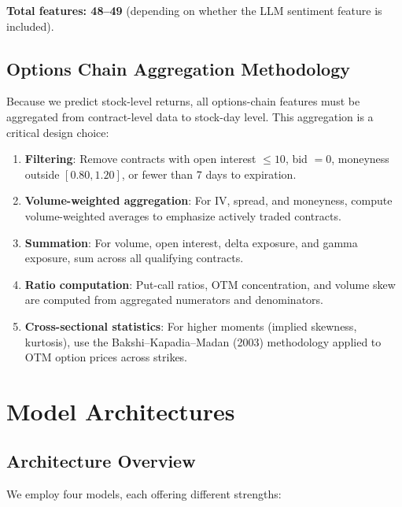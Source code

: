 \documentclass[11pt,a4paper]{article}
\begin{document}
\textbf{Total features: 48--49} (depending on whether the LLM sentiment feature is included).

\subsection{Options Chain Aggregation Methodology}
\label{sec:aggregation}

Because we predict stock-level returns, all options-chain features must be aggregated from contract-level data to stock-day level. This aggregation is a critical design choice:

\begin{enumerate}[nosep]
    \item \textbf{Filtering}: Remove contracts with open interest $\leq 10$, bid $= 0$, moneyness outside $[0.80, 1.20]$, or fewer than 7 days to expiration.
    \item \textbf{Volume-weighted aggregation}: For IV, spread, and moneyness, compute volume-weighted averages to emphasize actively traded contracts.
    \item \textbf{Summation}: For volume, open interest, delta exposure, and gamma exposure, sum across all qualifying contracts.
    \item \textbf{Ratio computation}: Put-call ratios, OTM concentration, and volume skew are computed from aggregated numerators and denominators.
    \item \textbf{Cross-sectional statistics}: For higher moments (implied skewness, kurtosis), use the Bakshi--Kapadia--Madan (2003) methodology applied to OTM option prices across strikes.
\end{enumerate}


\section{Model Architectures}

\subsection{Architecture Overview}

We employ four models, each offering different strengths:
\end{document}
